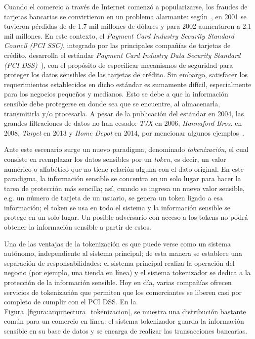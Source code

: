 \documentclass[conference]{IEEEtran}
\begin{document}
  Cuando el comercio a través de Internet comenzó a popularizarse, los fraudes
  de tarjetas bancarias se convirtieron en un problema alarmante:
  según~\cite{wallethub}, en 2001 se tuvieron pérdidas de de 1.7 mil millones de
  dólares y para 2002 aumentaron a 2.1 mil millones. En este contexto, el {\it
  Payment Card Industry Security Standard Council (PCI SSC)}, integrado por las
  principales compañías de tarjetas de crédito, desarrolla el estándar
  \textit{Payment Card Industry Data Security Standard (PCI
  DSS)}~\cite{pci_dss}), con el propósito de especificar mecanismos de seguridad
  para proteger los datos sensibles de las tarjetas de crédito. Sin embargo,
  satisfacer los requerimientos establecidos en dicho estándar es sumamente
  difícil, especialmente para los negocios pequeños y medianos. Esto se debe a
  que la información sensible debe protegerse en donde sea que se encuentre, al
  almacenarla, transmitirla y/o procesarla. A pesar de la publicación del
  estándar en 2004, las grandes filtraciones de datos no han cesado:
  \textit{TJX} en 2006, \textit{Hannaford Bros.} en 2008, \textit{Target} en
  2013 y \textit{Home Depot} en 2014, por mencionar algunos
  ejemplos~\cite{wallethub}.

  Ante este escenario surge un nuevo paradigma, denominado {\it tokenización},
  el cual consiste en reemplazar los datos sensibles por un {\it token}, es
  decir, un valor numérico o alfabético que no tiene relación alguna con el dato
  original. En este paradigma, la información sensible se concentra  en un solo
  lugar para hacer la tarea de protección más sencilla; así, cuando se ingresa
  un nuevo valor sensible, e.g. un número de tarjeta de un usuario, se genera un
  token ligado a esa información; el token se usa en todo el sistema y la
  información sensible se protege en un solo lugar. Un posible adversario con
  acceso a los tokens no podrá obtener la información sensible a partir de
  estos.

  Una de las ventajas de la tokenización es que puede verse como un sistema
  autónomo, independiente al sistema principal; de esta manera se establece una
  separación de responsabilidades: el sistema principal realiza la operación del
  negocio (por ejemplo, una tienda en línea) y el sistema tokenizador se dedica
  a la protección de la información sensible. Hoy en día, varias compañías
  ofrecen servicios de tokenización que permiten que los comerciantes se liberen
  casi por completo de cumplir con el PCI DSS. En la
  Figura~\ref{figura:arquitectura_tokenizacion}, se muestra una distribución
  bastante común para un comercio en línea: el sistema tokenizador guarda la
  información sensible en su base de datos y se encarga de realizar las
  transacciones bancarias.
\end{document}
